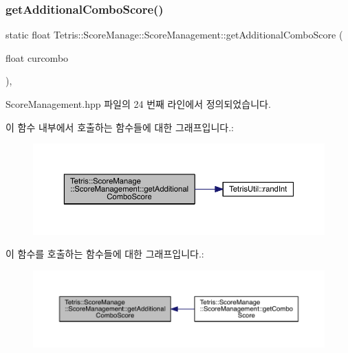 \subsubsection{\texorpdfstring{get\+Additional\+Combo\+Score()}{getAdditionalComboScore()}}
{\footnotesize\ttfamily static float Tetris\+::\+Score\+Manage\+::\+Score\+Management\+::get\+Additional\+Combo\+Score (\begin{DoxyParamCaption}\item[{float}]{curcombo }\end{DoxyParamCaption})\hspace{0.3cm}{\ttfamily [inline]}, {\ttfamily [static]}}



Score\+Management.\+hpp 파일의 24 번째 라인에서 정의되었습니다.

이 함수 내부에서 호출하는 함수들에 대한 그래프입니다.\+:
\nopagebreak
\begin{figure}[H]
\begin{center}
\leavevmode
\includegraphics[width=350pt]{class_tetris_1_1_score_manage_1_1_score_management_a66b6a1d3fdc8fb9f91f1d7bfc7854579_cgraph}
\end{center}
\end{figure}
이 함수를 호출하는 함수들에 대한 그래프입니다.\+:
\nopagebreak
\begin{figure}[H]
\begin{center}
\leavevmode
\includegraphics[width=350pt]{class_tetris_1_1_score_manage_1_1_score_management_a66b6a1d3fdc8fb9f91f1d7bfc7854579_icgraph}
\end{center}
\end{figure}
\mbox{\label{class_tetris_1_1_score_manage_1_1_score_management_a89203c0689645e7e4ad75d8fd634aa11}} 

